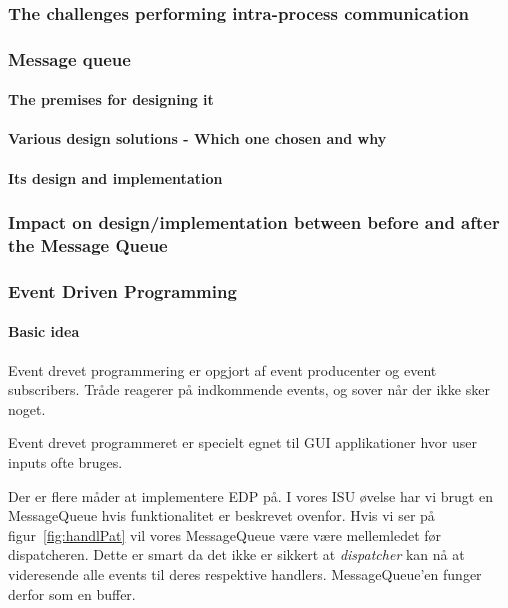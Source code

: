 \subsubsection{The challenges performing intra-process communication}


\subsubsection{Message queue}

\paragraph{The premises for designing it}

\paragraph{Various design solutions - Which one chosen and why}

\paragraph{Its design and implementation}

\subsubsection{Impact on design/implementation between before and after the Message Queue}

\subsubsection{Event Driven Programming}

\paragraph{Basic idea}
Event drevet programmering er opgjort af event producenter og event subscribers.
Tråde reagerer på indkommende events, og sover når der ikke sker noget.

Event drevet programmeret er specielt egnet til GUI applikationer hvor user inputs ofte bruges.

Der er flere måder at implementere EDP på. I vores ISU øvelse har vi brugt en MessageQueue hvis funktionalitet er beskrevet ovenfor.
Hvis vi ser på figur~\ref{fig:handlPat} vil vores MessageQueue være være mellemledet før dispatcheren. Dette er smart da det ikke er sikkert at \textit{dispatcher} kan nå at videresende alle events til deres respektive handlers. MessageQueue'en funger derfor som en buffer. 

